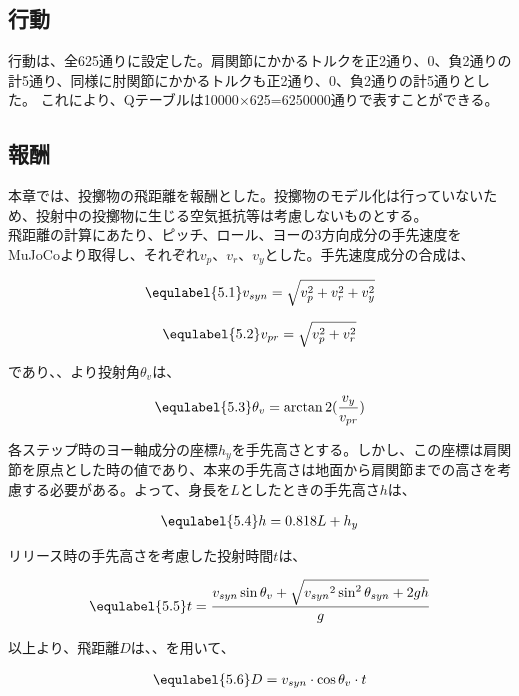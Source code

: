 \subsection{行動}
行動は、全625通りに設定した。肩関節にかかるトルクを正2通り、0、負2通りの計5通り、同様に肘関節にかかるトルクも正2通り、0、負2通りの計5通りとした。
これにより、Qテーブルは10000$\times$625=6250000通りで表すことができる。
\subsection{報酬}
本章では、投擲物の飛距離を報酬とした。投擲物のモデル化は行っていないため、投射中の投擲物に生じる空気抵抗等は考慮しないものとする。\\
飛距離の計算にあたり、ピッチ、ロール、ヨーの3方向成分の手先速度をMuJoCoより取得し、それぞれ$v_{p}$、$v_{r}$、$v_{y}$とした。手先速度成分の合成は、

\begin{eqnarray}
  \equlabel{5.1}
  v_{syn} = \sqrt{v_{p}^{2} + v_{r}^{2} + v_{y}^{2}}
\end{eqnarray}

\begin{eqnarray}
  \equlabel{5.2}
  v_{pr} = \sqrt{v_{p}^{2} + v_{r}^{2}}
\end{eqnarray}

であり、、より投射角$\theta_{v}$は、

\begin{eqnarray}
  \equlabel{5.3}
  \theta_{v} = \arctan2(\frac{v_{y}}{v_{pr}})
\end{eqnarray}

各ステップ時のヨー軸成分の座標$h_{y}$を手先高さとする。しかし、この座標は肩関節を原点とした時の値であり、本来の手先高さは地面から肩関節までの高さを考慮する必要がある。よって、身長を$L$としたときの手先高さ$h$は、

\begin{eqnarray}
  \equlabel{5.4}
  h = 0.818L + h_{y}
\end{eqnarray}

リリース時の手先高さを考慮した投射時間$t$は、

\begin{eqnarray}
  \equlabel{5.5}
  t = \frac{v_{syn}\sin\theta_{v} + \sqrt{{v_{syn}}^2\sin^2\theta_{syn} + 2gh}}{g}
\end{eqnarray}


以上より、飛距離$D$は、、を用いて、

\begin{eqnarray}
  \equlabel{5.6}
  D = v_{syn} \cdot \cos\theta_{v} \cdot t
\end{eqnarray}

